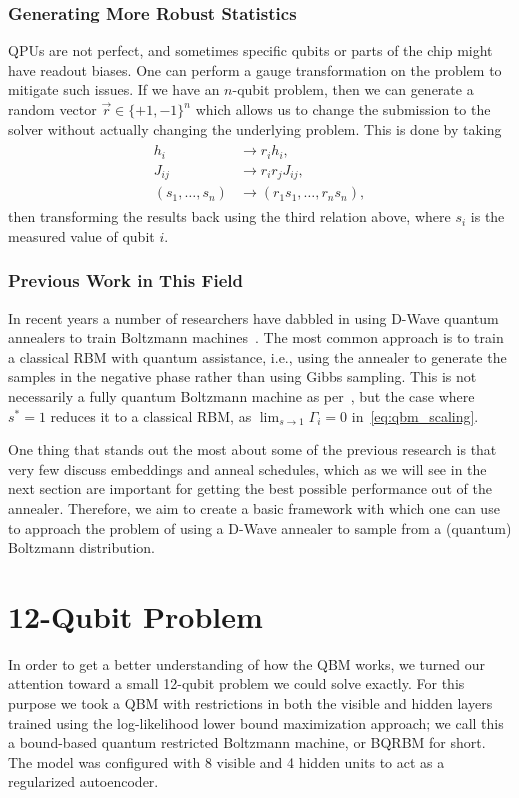 \subsubsection{Generating More Robust Statistics}\label{sec:gauge}
QPUs are not perfect, and sometimes specific qubits or parts of the chip might have readout biases.
One can perform a gauge transformation on the problem to mitigate such issues.
If we have an \( n \)-qubit problem, then we can generate a random vector \( \vec{r} \in \{+1, -1\}^n \) which allows us to change the submission to the solver without actually changing the underlying problem.
This is done by taking
\begin{align}
\begin{split}
    h_i
        &\rightarrow r_i h_i, \\
    J_{ij}
        &\rightarrow r_i r_j J_{ij}, \\
    (s_1, \dots, s_n)
        &\rightarrow (r_1 s_1, \dots, r_n s_n),
\end{split}
\end{align}
then transforming the results back using the third relation above, where \( s_i \) is the measured value of qubit \( i \).

\subsubsection{Previous Work in This Field}
In recent years a number of researchers have dabbled in using D-Wave quantum annealers to train Boltzmann machines~\cite{adachi_2015,benedetti_2016,anschuetz_2019,wiebe_2019,rocutto_2020,dixit_2021,ilmo_2021,wilson_2021,xu_2021}.
The most common approach is to train a classical RBM with quantum assistance, i.e., using the annealer to generate the samples in the negative phase rather than using Gibbs sampling.
This is not necessarily a fully quantum Boltzmann machine as per~\cite{amin_2018}, but the case where \( s^* = 1 \) reduces it to a classical RBM, as \( \lim_{s\rightarrow 1} \Gamma_i = 0 \) in~\cref{eq:qbm_scaling}.

One thing that stands out the most about some of the previous research is that very few discuss embeddings and anneal schedules, which as we will see in the next section are important for getting the best possible performance out of the annealer.
Therefore, we aim to create a basic framework with which one can use to approach the problem of using a D-Wave annealer to sample from a (quantum) Boltzmann distribution.

\section{12-Qubit Problem}\label{sec:qbm_12_qubit_problem}
In order to get a better understanding of how the QBM works, we turned our attention toward a small 12-qubit problem we could solve exactly.
For this purpose we took a QBM with restrictions in both the visible and hidden layers trained using the log-likelihood lower bound maximization approach; we call this a bound-based quantum restricted Boltzmann machine, or BQRBM for short.
The model was configured with 8 visible and 4 hidden units to act as a regularized autoencoder.


